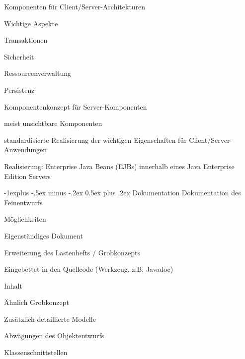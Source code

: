 \documentclass[a4paper]{article}
\makeatletter
\renewcommand{\subsection}{\@startsection{subsection}{2}{0mm}%
                                {-1explus -.5ex minus -.2ex}%
                                {0.5ex plus .2ex}%
                                {\normalfont\normalsize\bfseries}}
\makeatother
\begin{document}
\begin{multicols}{3}
  Komponenten für Client/Server-Architekturen
  \begin{itemize*}
    \item Wichtige Aspekte
          \begin{itemize*}
            \item Transaktionen
            \item Sicherheit
            \item Ressourcenverwaltung
            \item Persistenz
          \end{itemize*}
    \item Komponentenkonzept für Server-Komponenten
          \begin{itemize*}
            \item meist unsichtbare Komponenten
            \item standardisierte Realisierung der wichtigen Eigenschaften für Client/Server-Anwendungen
            \item Realisierung: Enterprise Java Beans (EJBs) innerhalb eines Java Enterprise Edition Servers
          \end{itemize*}
  \end{itemize*}

  \subsection{Dokumentation}
  Dokumentation des Feinentwurfs
  \begin{itemize*}
    \item Möglichkeiten
          \begin{itemize*}
            \item Eigenständiges Dokument
            \item Erweiterung des Lastenhefts / Grobkonzepts
            \item Eingebettet in den Quellcode (Werkzeug, z.B. Javadoc)
          \end{itemize*}
    \item Inhalt
          \begin{itemize*}
            \item Ähnlich Grobkonzept
            \item Zusätzlich detaillierte Modelle
            \item Abwägungen des Objektentwurfs
            \item Klassenschnittstellen
          \end{itemize*}
  \end{itemize*}


\end{multicols}
\end{document}
